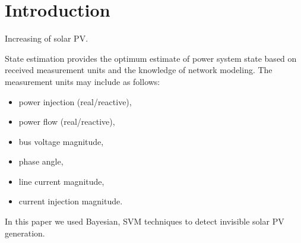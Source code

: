 \section{Introduction}

Increasing of solar PV.

State estimation provides the optimum estimate of power system state based on received measurement units and the knowledge of network modeling. The measurement units may include as follows:
\begin{itemize}
  \item power injection (real/reactive),
  \item power flow (real/reactive),
  \item bus voltage magnitude,
  \item phase angle,
  \item line current magnitude,
  \item current injection magnitude.
\end{itemize}

In this paper we used Bayesian, SVM techniques to detect invisible solar PV generation.
